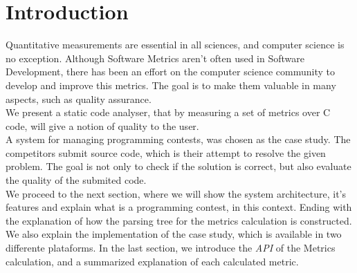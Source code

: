 \section{Introduction}
Quantitative measurements are essential in all sciences, and computer science is no exception.
Although Software Metrics aren't often used in Software Development, there has been an effort on the computer science community to develop and improve this metrics. 
The goal is to make them valuable in many aspects, such as quality assurance.\\
We present a static code analyser, that by measuring a set of metrics over C code, will give a notion of quality to the user.\\
A system for managing programming contests, was chosen as the case study.
The competitors submit source code, which is their attempt to resolve the given problem.
The goal is not only to check if the solution is correct, but also evaluate the quality of the submited code.\\
We proceed to the next section, where we will show the system architecture, it's features and explain what is a programming contest, in this context.
Ending with the explanation of how the parsing tree for the metrics calculation is constructed.
We also explain the implementation of the case study, which is available in two differente plataforms.
In the last section, we introduce the \textit{API} of the Metrics calculation, and a summarized explanation of each calculated metric.

